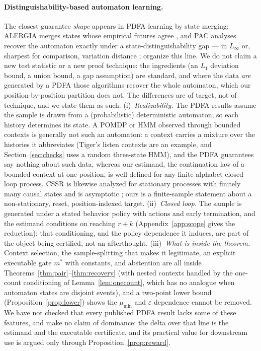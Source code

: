 \documentclass{article}
\newcommand{\eps}{\varepsilon}
\begin{document}
\paragraph{Distinguishability-based automaton learning.}
The closest guarantee \emph{shape} appears in PDFA learning by state
merging: ALERGIA merges states whose empirical futures agree
\citep{carrasco1994learning}, and PAC analyses recover the automaton exactly
under a state-distinguishability gap --- in $L_\infty$
\citep{clark2004pac} or, sharpest for comparison, variation distance
\citep{palmer2007pac}; \citet{balle2013learning} organize this line.  We
do not claim a new test statistic or a new proof technique: the ingredients
(an $L_1$ deviation bound, a union bound, a gap assumption) are standard,
and where the data \emph{are} generated by a PDFA those algorithms recover
the whole automaton, which our position-by-position partition does not.  The
differences are of target, not of technique, and we state them as such.
(i)~\emph{Realizability.}  The PDFA results assume the sample is drawn from a
(probabilistic) deterministic automaton, so each history determines its
state.  A POMDP or HMM observed through bounded contexts is generally not
such an automaton: a context carries a mixture over the histories it
abbreviates (Tiger's listen contexts are an example, and
Section~\ref{sec:checks} uses a random three-state HMM), and the PDFA
guarantees say nothing about such data, whereas our estimand, the
continuation law of a bounded context at one position, is well defined for
any finite-alphabet closed-loop process.  CSSR is likewise analyzed for
stationary processes with finitely many causal states and is asymptotic
\citep{shalizi2004blind}; ours is a finite-sample statement about a
non-stationary, reset, position-indexed target.
(ii)~\emph{Closed loop.}  The sample is generated under a stated behavior
policy with actions and early termination, and the estimand conditions on
reaching $r+k$ (Appendix~\ref{app:scope} gives the reduction); that
conditioning, and the policy dependence it induces, are part of the object
being certified, not an afterthought.
(iii)~\emph{What is inside the theorem.}  Context selection, the
sample-splitting that makes it legitimate, an explicit executable gate
$m^*$ with constants, and abstention are all inside
Theorems~\ref{thm:pair}--\ref{thm:recovery} (with nested contexts handled by
the one-count conditioning of Lemma~\ref{lem:onecount}, which has no analogue
when automaton states are disjoint events), and a two-point lower bound
(Proposition~\ref{prop:lower}) shows the $\mu_{\min}$ and $\eps$
dependence cannot be removed.  We have not checked that every published PDFA
result lacks some of these features, and make no claim of dominance:
the delta over that line is the estimand and the executable certificate, and
its practical value for downstream use is argued only through
Proposition~\ref{prop:reward}.
\end{document}
